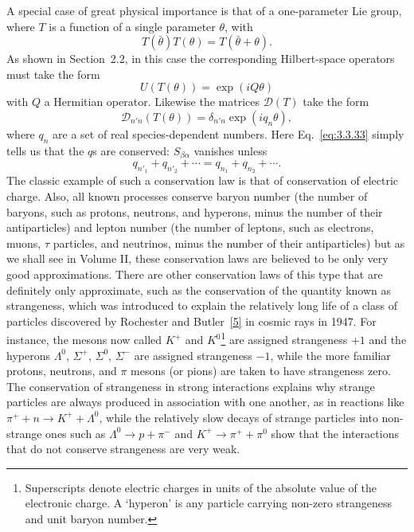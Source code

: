 A special case of great physical importance is that of a one-parameter Lie group,
where $T$ is a function of a single parameter $\theta$, with
\begin{equation}
T(\bar\theta)T(\theta)=T(\bar\theta+\theta).
\tag{3.3.37}\label{eq:3.3.37}
\end{equation}
As shown in Section~2.2, in this case the corresponding Hilbert-space operators
must take the form
\begin{equation}
U(T(\theta))=\exp(iQ\theta)
\tag{3.3.38}\label{eq:3.3.38}
\end{equation}
with $Q$ a Hermitian operator. Likewise the matrices $\mathcal{D}(T)$ take the form
\begin{equation}
\mathcal{D}_{n'n}(T(\theta))=\delta_{n'n}\exp(iq_n\theta),
\tag{3.3.39}\label{eq:3.3.39}
\end{equation}
where $q_n$ are a set of real species-dependent numbers. Here Eq.~\eqref{eq:3.3.33} simply
tells us that the $q$s are conserved: $S_{\beta\alpha}$ vanishes unless
\begin{equation}
q_{n'_1}+q_{n'_2}+\cdots=q_{n_1}+q_{n_2}+\cdots.
\tag{3.3.40}\label{eq:3.3.40}
\end{equation}
The classic example of such a conservation law is that of conservation of electric
charge. Also, all known processes conserve baryon number (the number of baryons,
such as protons, neutrons, and hyperons, minus the number of their antiparticles)
and lepton number (the number of leptons, such as electrons, muons, $\tau$ particles,
and neutrinos, minus the number of their antiparticles) but as we shall see in
Volume II, these conservation laws are believed to be only very good approximations.
There are other conservation laws of this type that are definitely only approximate,
such as the conservation of the quantity known as strangeness, which was introduced
to explain the relatively long life of a class of particles discovered by Rochester
and Butler~\hyperref[ref:3.5]{[5]} in cosmic rays in 1947. For instance, the mesons now called $K^+$ and
$K^0$\footnote{Superscripts denote electric charges in units of the absolute value
of the electronic charge. A `hyperon' is any particle carrying non-zero strangeness
and unit baryon number.} are assigned strangeness $+1$ and the hyperons
$\Lambda^0$, $\Sigma^+$, $\Sigma^0$, $\Sigma^-$ are assigned strangeness $-1$,
while the more familiar protons, neutrons, and $\pi$ mesons (or pions) are taken to
have strangeness zero. The conservation of strangeness in strong interactions
explains why strange particles are always produced in association with one another,
as in reactions like $\pi^++n\to K^++\Lambda^0$, while the relatively slow decays
of strange particles into non-strange ones such as $\Lambda^0\to p+\pi^-$ and
$K^+\to\pi^++\pi^0$ show that the interactions that do not conserve strangeness
are very weak.

